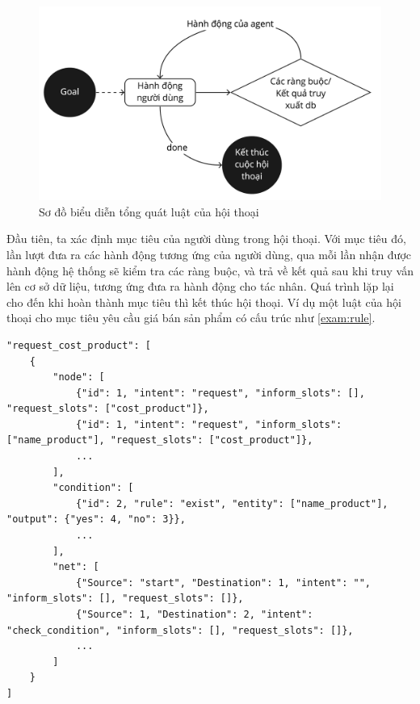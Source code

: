 \begin{center}
    \begin{figure}[h!]
        \begin{center}
         \includegraphics[scale=0.16]{chapter4/img/dialog.jpg}
        \end{center}
        \caption{Sơ đồ biểu diễn tổng quát luật của hội thoại}
        \label{fig:dialog}
    \end{figure}
\end{center}

Đầu tiên, ta xác định mục tiêu của người dùng trong hội thoại. Với mục tiêu đó, lần lượt đưa ra các hành động tương ứng của người dùng, qua mỗi lần nhận được hành động hệ thống sẽ kiểm tra các ràng buộc, và trả về kết quả sau khi truy vấn lên cơ sở dữ liệu, tương ứng đưa ra hành động cho tác nhân. Quá trình lặp lại cho đến khi hoàn thành mục tiêu thì kết thúc hội thoại. Ví dụ một luật của hội thoại cho mục tiêu yêu cầu giá bán sản phẩm có cấu trúc như \ref{exam:rule}.

\renewcommand{\lstlistingname}{Ví dụ}
\begin{lstlisting}[caption={Luật của hội thoại cho mục tiêu yêu cầu giá bán sản phẩm},label={exam:rule},language=code_en,firstnumber=1]
"request_cost_product": [
    {
        "node": [
            {"id": 1, "intent": "request", "inform_slots": [], "request_slots": ["cost_product"]},
            {"id": 1, "intent": "request", "inform_slots": ["name_product"], "request_slots": ["cost_product"]},
            ...
        ],
        "condition": [
            {"id": 2, "rule": "exist", "entity": ["name_product"], "output": {"yes": 4, "no": 3}},
            ...
        ],
        "net": [
            {"Source": "start", "Destination": 1, "intent": "", "inform_slots": [], "request_slots": []},
            {"Source": 1, "Destination": 2, "intent": "check_condition", "inform_slots": [], "request_slots": []},
            ...
        ]
    }
]
\end{lstlisting}

